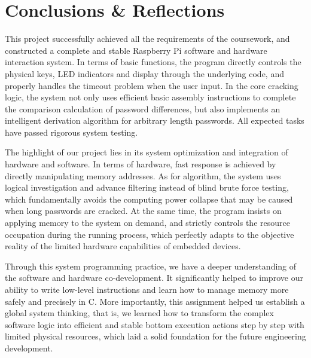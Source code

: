 \section{Conclusions \& Reflections}
\label{sec:conclusion}

This project successfully achieved all the requirements of the coursework, and constructed a complete and stable Raspberry Pi software and hardware interaction system. In terms of basic functions, the program directly controls the physical keys, LED indicators and display through the underlying code, and properly handles the timeout problem when the user input. In the core cracking logic, the system not only uses efficient basic assembly instructions to complete the comparison calculation of password differences, but also implements an intelligent derivation algorithm for arbitrary length passwords. All expected tasks have passed rigorous system testing.

The highlight of our project lies in its system optimization and integration of hardware and software. In terms of hardware, fast response is achieved by directly manipulating memory addresses. As for algorithm, the system uses logical investigation and advance filtering instead of blind brute force testing, which fundamentally avoids the computing power collapse that may be caused when long passwords are cracked. At the same time, the program insists on applying memory to the system on demand, and strictly controls the resource occupation during the running process, which perfectly adapts to the objective reality of the limited hardware capabilities of embedded devices.

Through this system programming practice, we have a deeper understanding of the software and hardware co-development. It significantly helped to improve our ability to write low-level instructions and learn how to manage memory more safely and precisely in C. More importantly, this assignment helped us establish a global system thinking, that is, we learned how to transform the complex software logic into efficient and stable bottom execution actions step by step with limited physical resources, which laid a solid foundation for the future engineering development.
